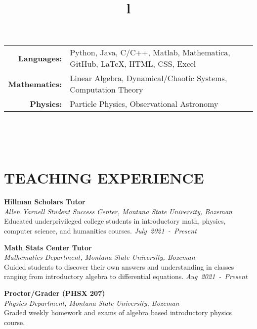 \documentclass[margin]{res}
\begin{document}
\begin{resume}
{
\begin{tabular}{r p{9.5cm}}
\textbf{Languages:}   & Python, Java, C/C++, Matlab, Mathematica, GitHub, LaTeX, HTML, CSS, Excel \vspace{0.5ex}\\
\textbf{Mathematics:} & Linear Algebra, Dynamical/Chaotic Systems, Computation Theory \vspace{0.5ex} \\
\textbf{Physics:}     & Particle Physics, Observational Astronomy   \\
\end{tabular}
}




\begin{format}
\title{l}\\
\\
\body\\
\end{format}

\section{TEACHING EXPERIENCE}
\noindent
\textbf{Hillman Scholars Tutor}\\
{\sl Allen Yarnell Student Success Center, Montana State University, Bozeman}\\\vspace{0.5ex}
Educated underprivileged college students in introductory math, physics, computer science, and humanities courses. \hfill
{\sl July~2021~-~Present}

\noindent
\raggedright
\textbf{Math Stats Center Tutor}\\
{\sl Mathematics Department, Montana State University, Bozeman}\\\vspace{0.5ex}
Guided students to discover their own answers and understanding in classes ranging from introductory algebra to differential equations. \hfill
{\sl Aug~2021~-~Present}

\noindent
\raggedright
\textbf{Proctor/Grader (PHSX 207)}\\
{\sl Physics Department, Montana State University, Bozeman}\\\vspace{0.5ex}
Graded weekly homework and exams of algebra based introductory physics course.\\


\end{resume}
\end{document}
